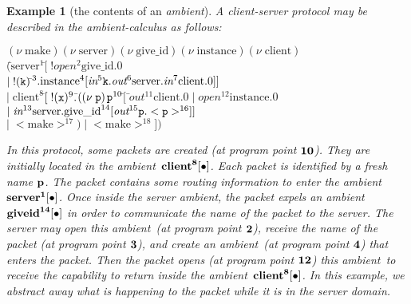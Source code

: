 \documentclass{article}
\newtheorem{example}[thm]{Example}
\newcommand{\ambient}{\emph{ambient}}
\newcommand{\concu}{|}
\newcommand{\nuu}{\nu\;}
\newcommand{\pp}[1]{$\bf{#1}$}
\newcommand{\pps}[1]{(at program point \pp{#1})}
\newcommand{\make}{\mathrm{make}}
\newcommand{\globalname}[1]{\mathrm{#1}}
\newcommand{\internal}[1]{\textnormal{\texttt{#1}}}
\newcommand{\server}{\globalname{server}}
\newcommand{\duplicate}{\globalname{give\_id}}
\newcommand{\instance}{\globalname{instance}}
\newcommand{\client}{\globalname{client}}
\newcommand{\ambk}{\internal{k}}
\newcommand{\ambx}{\internal{x}}
\newcommand{\ambp}{\internal{p}}
\newcommand{\amblaba}{1}
\newcommand{\amblabb}{2}
\newcommand{\amblabc}{3}
\newcommand{\amblabd}{4}
\newcommand{\amblabe}{5}
\newcommand{\amblabf}{6}
\newcommand{\amblabg}{7}
\newcommand{\amblabh}{8}
\newcommand{\amblabi}{9}
\newcommand{\amblabj}{10}
\newcommand{\amblabk}{11}
\newcommand{\amblabl}{12}
\newcommand{\amblabm}{13}
\newcommand{\amblabn}{14}
\newcommand{\amblabo}{15}
\newcommand{\amblabp}{16}
\newcommand{\amblabq}{17}
\newcommand{\amblabr}{18}
\newcommand{\bfclient}{\globalname{\bf client}}
\newcommand{\bfduplicate}{\globalname{\bf giveid}}
\newcommand{\bfp}{\internal{\bf p}}
\newcommand{\bfserver}{\globalname{\bf server}}
\begin{document}
\begin{example}[the contents of an \ambient]
\label{content}
A \emph{client-server} protocol  may be described in the \ambient-calculus as follows:
\begin{tabbing}
$(\nuu \make)(\nuu \server)(\nuu \duplicate)(\nuu \instance)$$(\nuu \client)$\\
$($\=$\mathrm{server}^\amblaba$\=$[$$\;!\textit{open}^{\amblabb} \duplicate.0\;$\\
\>\>$\concu\;!(\ambk)$\=${}^{\amblabc}.\instance^{\amblabd}[\textit{in}{}^{\amblabe} \ambk.\textit{out}^{\amblabf} \server.\textit{in}^{\amblabg}\client.0]]$\\
$\concu\;\client^{\amblabh}$\=$[\;!(\ambx)^{\amblabi}.$\=$((\nuu \ambp)$$\ambp^{\amblabj}$\=$[\;$\=$\textit{out}^{\amblabk} \client.0\;\concu\;\textit{open}^{\amblabl} \instance.0\;$\\
\>\>\>$\concu\;\textit{in}^{\amblabm} \server.\duplicate^{\amblabn}[\textit{out}^{\amblabo} \ambp.<\ambp>^{\amblabp}]]$\\
\>\>$\concu\;<\make>^{\amblabq}$$)$$\;\concu\;<\make>^{\amblabr}$$])$
\end{tabbing}
In this protocol, some packets are created \pps{\amblabj}. They are initially located in the \ambient\ ${\bf{\bfclient^{\amblabh}[\bullet]}}$. Each packet is identified by a fresh name $\bfp$. The packet contains some routing information to enter the \ambient\ ${\bf{\bfserver^{\amblaba}[\bullet]}}$. Once inside the server \ambient, the packet expels an \ambient\ ${\bf{\bfduplicate^{\amblabn}[\bullet]}}$ in order to communicate the name of the packet to the server.
The server may open this \ambient\ \pps{\amblabb}, receive the name of the packet \pps{\amblabc}, and create an \ambient\ \pps{\amblabd} that enters the packet. Then the packet opens \pps{\amblabl} this \ambient\ to receive the capability to return inside the \ambient\ ${\bf{\bfclient^{\amblabh}[\bullet]}}$.
In this example, we abstract away what is happening to the packet while it is in the server domain. 



\end{example}
\end{document}
